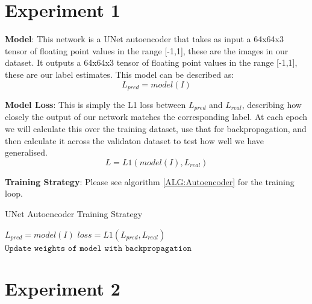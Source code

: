 \documentclass{UoYCSproject}
\begin{document}
\section{Experiment 1}

\textbf{Model}: This network is a UNet autoencoder that takes as input a 64x64x3 tensor of floating point values in the range [-1,1], these are the images in our dataset.
It outputs a 64x64x3 tensor of floating point values in the range [-1,1], these are our label estimates.
This model can be described as: \[ L_{pred} = model(I) \]

\textbf{Model Loss}: This is simply the L1 loss between $L_{pred}$ and $L_{real}$, describing how closely the output of our network matches the corresponding label. At each epoch we will calculate this over the training dataset, use that for backpropagation, and then calculate it across the validaton dataset to test how well we have generalised.
\[ L = L1( model(I), L_{real} ) \]

\textbf{Training Strategy}: Please see algorithm \ref{ALG:Autoencoder} for the training loop.

\begin{algorithm}
\caption{UNet Autoencoder Training Strategy}\label{ALG:Autoencoder}
\begin{algorithmic}[1]
\State
\State $L_{pred} = model(I)$
\State $loss = L1( L_{pred}, L_{real} ) $
\State $\texttt{Update weights of model with backpropagation}$
\State
\EndFor
\EndFor
\end{algorithmic}
\end{algorithm}

\section{Experiment 2}
\end{document}
